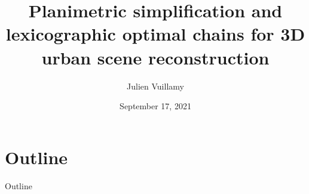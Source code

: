 \documentclass{beamer}
\title{Planimetric simplification and lexicographic optimal chains for 3D urban scene reconstruction}
\author[Julien Vuillamy]{Julien Vuillamy}
\institute[]{Dassault Systèmes Provence - INRIA Sophia Antipolis TITANE}
\date{September 17, 2021}
\begin{document}
	\begin{frame}
		\titlepage
	\end{frame}
		
	\section*{Outline}
	\begin{frame}{Outline}
 	    \tableofcontents
	\end{frame}
	
	
	
	
	
		
	\appendix
	
	




\end{document}
